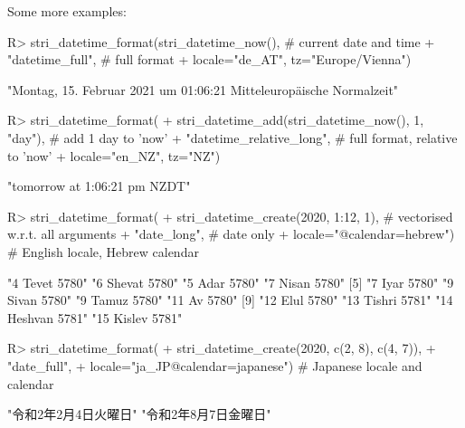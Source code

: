 \documentclass[nojss]{jss}\usepackage[]{graphicx}\usepackage[]{color}
\begin{document}
Some more examples:



\begin{Schunk}
\begin{Sinput}
R> stri_datetime_format(stri_datetime_now(), # current date and time
+    "datetime_full",                        # full format
+    locale="de_AT", tz="Europe/Vienna")
\end{Sinput}
\begin{Soutput}
[1] "Montag, 15. Februar 2021 um 01:06:21 Mitteleuropäische Normalzeit"
\end{Soutput}
\begin{Sinput}
R> stri_datetime_format(
+    stri_datetime_add(stri_datetime_now(), 1, "day"), # add 1 day to 'now'
+    "datetime_relative_long",              # full format, relative to 'now'
+    locale="en_NZ", tz="NZ")
\end{Sinput}
\begin{Soutput}
[1] "tomorrow at 1:06:21 pm NZDT"
\end{Soutput}
\begin{Sinput}
R> stri_datetime_format(
+    stri_datetime_create(2020, 1:12, 1),   # vectorised w.r.t. all arguments
+    "date_long",                           # date only
+    locale="@calendar=hebrew")             # English locale, Hebrew calendar
\end{Sinput}
\begin{Soutput}
 [1] "4 Tevet 5780"    "6 Shevat 5780"   "5 Adar 5780"     "7 Nisan 5780"
 [5] "7 Iyar 5780"     "9 Sivan 5780"    "9 Tamuz 5780"    "11 Av 5780"
 [9] "12 Elul 5780"    "13 Tishri 5781"  "14 Heshvan 5781" "15 Kislev 5781"
\end{Soutput}
\begin{Sinput}
R> stri_datetime_format(
+    stri_datetime_create(2020, c(2, 8), c(4, 7)),
+    "date_full",
+    locale="ja_JP@calendar=japanese")      # Japanese locale and calendar
\end{Sinput}
\begin{Soutput}
[1] "令和2年2月4日火曜日" "令和2年8月7日金曜日"
\end{Soutput}
\end{Schunk}







\end{document}
